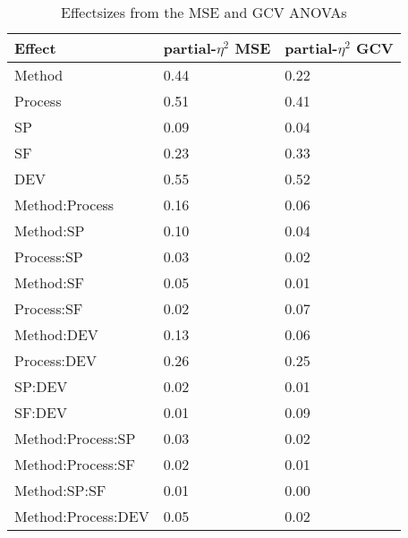 \documentclass[man, floatsintext]{apa7}
\begin{document}
\begin{table}[tbp]
  \begin{center}
    \begin{threeparttable}
      \caption{Effectsizes from the MSE and GCV ANOVAs}
      \label{tab:peta}
      \begin{tabular}{lll}
        \toprule
        Effect             & \multicolumn{1}{c}{partial-$\eta^2$ MSE} &
        \multicolumn{1}{c}{partial-$\eta^2$ GCV}
        \\
        \midrule
        Method             & 0.44                                     & 0.22 \\
        Process            & 0.51                                     & 0.41 \\
        SP                 & 0.09                                     & 0.04 \\
        SF                 & 0.23                                     & 0.33 \\
        DEV                & 0.55                                     & 0.52 \\
        Method:Process     & 0.16                                     & 0.06 \\
        Method:SP          & 0.10                                     & 0.04 \\
        Process:SP         & 0.03                                     & 0.02 \\
        Method:SF          & 0.05                                     & 0.01 \\
        Process:SF         & 0.02                                     & 0.07 \\
        Method:DEV         & 0.13                                     & 0.06 \\
        Process:DEV        & 0.26                                     & 0.25 \\
        SP:DEV             & 0.02                                     & 0.01 \\
        SF:DEV             & 0.01                                     & 0.09 \\
        Method:Process:SP  & 0.03                                     & 0.02 \\
        Method:Process:SF  & 0.02                                     & 0.01 \\
        Method:SP:SF       & 0.01                                     & 0.00 \\
        Method:Process:DEV & 0.05                                     & 0.02 \\

\end{tabular}
\end{threeparttable}
\end{center}
\end{table}
\end{document}
